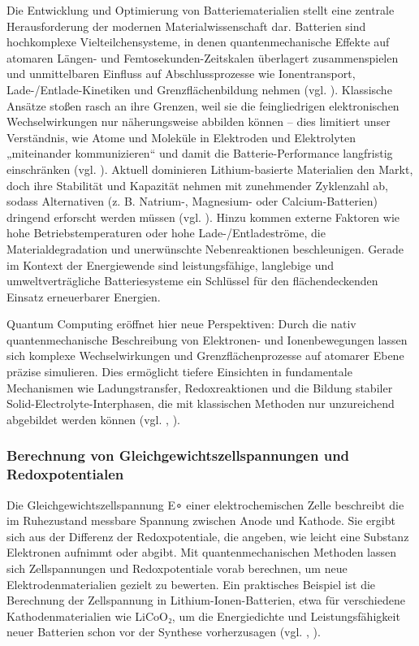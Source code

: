 Die Entwicklung und Optimierung von Batteriematerialien stellt eine zentrale Herausforderung der modernen Materialwissenschaft dar. Batterien sind hochkomplexe Vielteilchensysteme, in denen quantenmechanische Effekte auf atomaren Längen- und Femtosekunden-Zeitskalen überlagert zusammenspielen und unmittelbaren Einfluss auf Abschlussprozesse wie Ionentransport, Lade-/Entlade-Kinetiken und Grenzflächenbildung nehmen (vgl. \cite{bauer_quantum_2020}). Klassische Ansätze stoßen rasch an ihre Grenzen, weil sie die feingliedrigen elektronischen Wechselwirkungen nur näherungsweise abbilden können – dies limitiert unser Verständnis, wie Atome und Moleküle in Elektroden und Elektrolyten „miteinander kommunizieren“ und damit die Batterie-Performance langfristig einschränken (vgl. \cite{demirApplicationQuantumComputing2024}).
Aktuell dominieren Lithium-basierte Materialien den Markt, doch ihre Stabilität und Kapazität nehmen mit zunehmender Zyklenzahl ab, sodass Alternativen (z. B. Natrium-, Magnesium- oder Calcium-Batterien) dringend erforscht werden müssen (vgl. \cite{demirApplicationQuantumComputing2024}). Hinzu kommen externe Faktoren wie hohe Betriebstemperaturen oder hohe Lade-/Entladeströme, die Materialdegradation und unerwünschte Nebenreaktionen beschleunigen. Gerade im Kontext der Energiewende sind leistungsfähige, langlebige und umweltverträgliche Batteriesysteme ein Schlüssel für den flächendeckenden Einsatz erneuerbarer Energien.

Quantum Computing eröffnet hier neue Perspektiven: Durch die nativ quantenmechanische Beschreibung von Elektronen- und Ionenbewegungen lassen sich komplexe Wechselwirkungen und Grenzflächenprozesse auf atomarer Ebene präzise simulieren. Dies ermöglicht tiefere Einsichten in fundamentale Mechanismen wie Ladungstransfer, Redoxreaktionen und die Bildung stabiler Solid-Electrolyte-Interphasen, die mit klassischen Methoden nur unzureichend abgebildet werden können (vgl. \cite{bauer_quantum_2020}, \cite{demirApplicationQuantumComputing2024}).


\subsubsection{Berechnung von Gleichgewichtszellspannungen und Redoxpotentialen}
Die Gleichgewichtszellspannung E∘ einer elektrochemischen Zelle beschreibt die im Ruhezustand messbare Spannung zwischen Anode und Kathode. Sie ergibt sich aus der Differenz der Redoxpotentiale, die angeben, wie leicht eine Substanz Elektronen aufnimmt oder abgibt. Mit quantenmechanischen Methoden lassen sich Zellspannungen und Redoxpotentiale vorab berechnen, um neue Elektrodenmaterialien gezielt zu bewerten. Ein praktisches Beispiel ist die Berechnung der Zellspannung in Lithium-Ionen-Batterien, etwa für verschiedene Kathodenmaterialien wie LiCoO₂, um die Energiedichte und Leistungsfähigkeit neuer Batterien schon vor der Synthese vorherzusagen (vgl. \cite{urban_computational_2016}, \cite{hanaor_computational_2024}).

